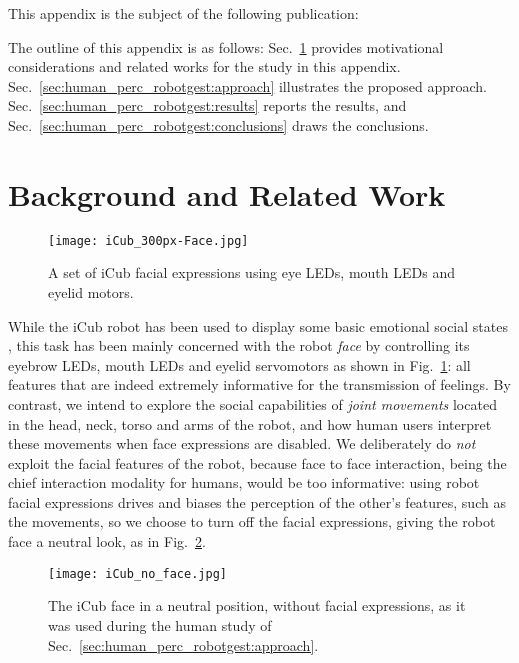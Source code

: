 This appendix is the subject of the following publication:
\listPublicationsAppendixHumanPercRobotGest

The outline of this appendix is as follows:
Sec.~\ref{sec:human_perc_robotgest:background} provides motivational considerations and related works for the study in this appendix.
Sec.~\ref{sec:human_perc_robotgest:approach} illustrates the proposed approach.
Sec.~\ref{sec:human_perc_robotgest:results} reports the results, and
Sec.~\ref{sec:human_perc_robotgest:conclusions} draws the conclusions.

\section{Background and Related Work}
\label{sec:human_perc_robotgest:background}

\begin{figure}
\texttt{[image: iCub\_300px-Face.jpg]}
\caption{A set of iCub facial expressions using eye LEDs, mouth LEDs and eyelid motors.}
\label{fig:iCub_facial_expressions}
\end{figure}

While the iCub robot has been used to display some basic emotional social states \cite{barros:2015:humanoids,raffard:2016:schizophrenia,pacella:2017:emotions}, this task has been mainly concerned with the robot \emph{face} by controlling its eyebrow LEDs, mouth LEDs and eyelid servomotors as shown in Fig.~\ref{fig:iCub_facial_expressions}: all features that are indeed extremely informative for the transmission of feelings. By contrast, we intend to explore the social capabilities of \emph{joint movements} located in the head, neck, torso and arms of the robot, and how human users interpret these movements when face expressions are disabled. We deliberately do \emph{not} exploit the facial features of the robot, because face to face interaction, being the chief interaction modality for humans, would be too informative: using robot facial expressions drives and biases the perception of the other's features, such as the movements, so we choose to turn off the facial expressions, giving the robot face a neutral look, as in Fig.~\ref{fig:iCub_no_face}.

\begin{figure}
\texttt{[image: iCub\_no\_face.jpg]}
\caption[The iCub face in a neutral position, without facial expressions.]{The iCub face in a neutral position, without facial expressions, as it was used during the human study of Sec.~\ref{sec:human_perc_robotgest:approach}.}
\label{fig:iCub_no_face}
\end{figure}

